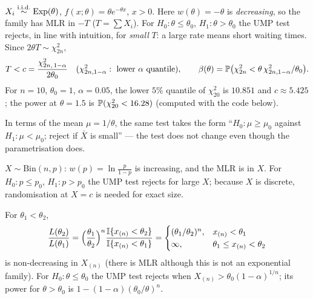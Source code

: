 \documentclass[main.tex]{subfiles}
\begin{document}
\begin{example}\label{ex:ustel-ump}
$X_i\iid\text{Exp}(\theta)$, $f(x;\theta)=\theta e^{-\theta x}$, $x>0$. Here $w(\theta)=-\theta$ is \emph{decreasing}, so the family has MLR in $-T$ ($T=\sum X_i$). For $H_0:\theta\le\theta_0$, $H_1:\theta>\theta_0$ the UMP test rejects, in line with intuition, for \emph{small} $T$: a large rate means short waiting times. Since $2\theta T\sim\chi^2_{2n}$,
\[
T<c=\frac{\chi^2_{2n,\,1-\alpha}}{2\theta_0}\quad(\chi^2_{2n,1-\alpha}:\ \text{lower }\alpha\text{ quantile}),\qquad\beta(\theta)=\P\big(\chi^2_{2n}<\theta\,\chi^2_{2n,1-\alpha}/\theta_0\big).
\]
For $n=10$, $\theta_0=1$, $\alpha=0.05$, the lower $5\%$ quantile of $\chi^2_{20}$ is $10.851$ and $c\approx5.425$; the power at $\theta=1.5$ is $\P(\chi^2_{20}<16.28)$ (computed with the code below).

In terms of the mean $\mu=1/\theta$, the same test takes the form ``$H_0:\mu\ge\mu_0$ against $H_1:\mu<\mu_0$; reject if $\bar X$ is small'' --- the test does not change even though the parametrisation does.
\end{example}

\begin{example}
$X\sim\text{Bin}(n,p)$: $w(p)=\ln\frac{p}{1-p}$ is increasing, and the MLR is in $X$. For $H_0:p\le p_0$, $H_1:p>p_0$ the UMP test rejects for large $X$; because $X$ is discrete, randomisation at $X=c$ is needed for exact size.
\end{example}

\begin{example}
For $\theta_1<\theta_2$,
\[
\frac{L(\theta_2)}{L(\theta_1)}=\Big(\frac{\theta_1}{\theta_2}\Big)^n\frac{\I\{x_{(n)}<\theta_2\}}{\I\{x_{(n)}<\theta_1\}}=\begin{cases}(\theta_1/\theta_2)^n, & x_{(n)}<\theta_1\\ \infty, & \theta_1\le x_{(n)}<\theta_2\end{cases}
\]
is non-decreasing in $X_{(n)}$ (there is MLR although this is not an exponential family). For $H_0:\theta\le\theta_0$ the UMP test rejects when $X_{(n)}>\theta_0(1-\alpha)^{1/n}$; its power for $\theta>\theta_0$ is $1-(1-\alpha)(\theta_0/\theta)^n$.
\end{example}
\end{document}
